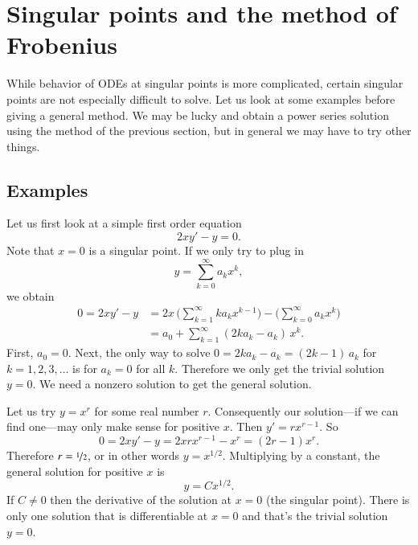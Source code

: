 \documentclass[12pt]{book}
\begin{document}

\sectionnewpage
\section{Singular points and the method of Frobenius}


While behavior of ODEs at singular points is more complicated,
certain singular points are
not especially difficult to solve.  Let us look at some examples
before giving a general method.  We may be lucky and obtain a power series
solution using the method of the previous section, but in general we may
have to try other things.

\subsection{Examples}

\begin{example}
Let us first look at a simple first order equation 
\begin{equation*}
2 x y' - y = 0 .
\end{equation*}
Note that $x=0$ is a singular point.
If we only try to plug in
\begin{equation*}
y = \sum_{k=0}^\infty a_k x^k ,
\end{equation*}
we obtain
\begin{equation*}
\begin{split}
0 = 2 xy'-y &= 
2x \, \Biggl( \sum_{k=1}^\infty k a_k x^{k-1}  \Biggr)
-
\Biggl( \sum_{k=0}^\infty a_k x^k \Biggr)
\\
& =
a_0 + 
\sum_{k=1}^\infty (2 k a_k - a_k) \, x^{k} .
\end{split}
\end{equation*}
First, $a_0 = 0$.  Next, the only way to solve
$0 = 2 k a_k - a_k = (2k-1) \, a_k$
for $k = 1,2,3,\dots$ is for $a_k = 0$ for all $k$.
Therefore we only get the trivial solution $y=0$.  We need
a nonzero solution to get the general solution.

Let us try $y=x^r$
for some real number $r$.  
Consequently our solution---if we can
find one---may only make sense for positive $x$.
Then $y' = r x^{r-1}$.  So
\begin{equation*}
0 = 2 x y' - y = 2 x r x^{r-1} - x^r = (2r-1) x^r .
\end{equation*}
Therefore $r= \nicefrac{1}{2}$, or in other words $y = x^{1/2}$.
Multiplying by a constant, the general solution for positive $x$ is
\begin{equation*}
y = C x^{1/2} .
\end{equation*}
If $C \not= 0$ then
the derivative of the solution  at $x=0$ (the
singular point).  There is only one solution that is differentiable
at $x=0$ and that's the trivial solution $y=0$.
\end{example}
\end{document}
